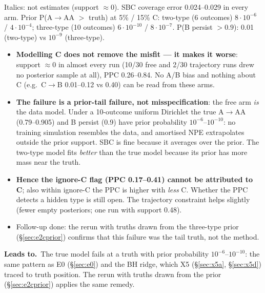 \documentclass[10pt,a4paper]{article}
\newcommand{\blk}[1]{\par\needspace{5\baselineskip}\smallskip{\sffamily\bfseries\color{inkgray}#1}\par}
\newcommand{\Comment}{\blk{Comment}}
\newcommand{\Leads}[1]{\begin{leadbox}{\sffamily\bfseries\color{caqua!70!black}Leads to.}\ #1\end{leadbox}}
\renewcommand{\blk}[1]{\par\Needspace*{5\baselineskip}\smallskip{\sffamily\bfseries\color{inkgray}#1}\par}
\newcommand{\sref}[1]{\S\ref{#1}}
\begin{document}
Italics: not estimates (support $\approx 0$). SBC coverage error 0.024--0.029 in every arm. Prior P(A$\to$AA $>$ truth) at 5\% / 15\% C: two-type (6 outcomes) $8\cdot10^{-6}$ / $4\cdot10^{-4}$; three-type (10 outcomes) $6\cdot10^{-10}$ / $8\cdot10^{-7}$. P(B persist $>0.9$): 0.01 (two-type) vs $10^{-9}$ (three-type).
\Comment
\begin{itemize}
\item \textbf{Modelling C does not remove the misfit --- it makes it worse}: support $\approx 0$ in almost every run (10/30 free and 2/30 trajectory runs drew no posterior sample at all), PPC 0.26--0.84. No A/B bias and nothing about C (e.g.\ C$\to$B 0.01--0.12 vs 0.40) can be read from these arms.
\item \textbf{The failure is a prior-tail failure, not misspecification}: the free arm \emph{is} the data model. Under a 10-outcome uniform Dirichlet the true A$\to$AA (0.79--0.905) and B persist (0.9) have prior probability $10^{-6}$--$10^{-10}$: no training simulation resembles the data, and amortised NPE extrapolates outside the prior support. SBC is fine because it averages over the prior. The two-type model fits \emph{better} than the true model because its prior has more mass near the truth.
\item \textbf{Hence the ignore-C flag (PPC 0.17--0.41) cannot be attributed to C}; also within ignore-C the PPC is higher with \emph{less} C. Whether the PPC detects a hidden type is still open. The trajectory constraint helps slightly (fewer empty posteriors; one run with support 0.48).
\item Follow-up done: the rerun with truths drawn from the three-type prior (\S\ref{sec:e2cprior}) confirms that this failure was the tail truth, not the method.
\end{itemize}
\Leads{The true model fails at a truth with prior probability $10^{-6}$--$10^{-10}$: the same pattern as E0 (\sref{sec:e0}) and the BH ridge, which X5 (\sref{sec:x5a}, \sref{sec:x5d}) traced to truth position. The rerun with truths drawn from the prior (\sref{sec:e2cprior}) applies the same remedy.}
\end{document}
